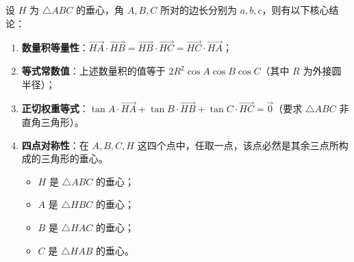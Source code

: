 \begin{statementbox}
设 $H$ 为 $\triangle ABC$ 的垂心，角 $A, B, C$ 所对的边长分别为 $a, b, c$，则有以下核心结论：
\begin{enumerate}
    \item \textbf{数量积等量性}：$\vec{HA} \cdot \vec{HB} = \vec{HB} \cdot \vec{HC} = \vec{HC} \cdot \vec{HA}$；
    \item \textbf{等式常数值}：上述数量积的值等于 $2R^2 \cos A \cos B \cos C$（其中 $R$ 为外接圆半径）；
    \item \textbf{正切权重等式}：$\tan A \cdot \vec{HA} + \tan B \cdot \vec{HB} + \tan C \cdot \vec{HC} = \vec{0}$（要求 $\triangle ABC$ 非直角三角形）。
    \item \textbf{四点对称性}：在 $A, B, C, H$ 这四个点中，任取一点，该点必然是其余三点所构成的三角形的垂心。
    \begin{itemize}
        \item $H$ 是 $\triangle ABC$ 的垂心；
        \item $A$ 是 $\triangle HBC$ 的垂心；
        \item $B$ 是 $\triangle HAC$ 的垂心；
        \item $C$ 是 $\triangle HAB$ 的垂心。
    \end{itemize}
\end{enumerate}
\end{statementbox}